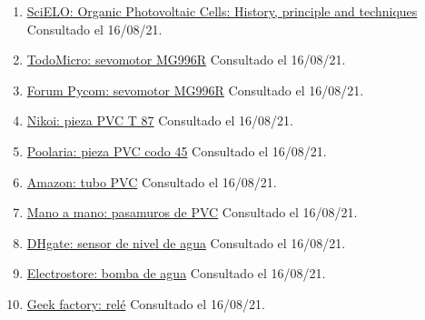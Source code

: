 \documentclass[12pt]{article}
\begin{document}
\begin{enumerate}
				\item 
				\label{bib: SciELO}
				\href{https://www.scielo.cl/scielo.php?script=sci_arttext\&pid=S0717-97072008000300001}{SciELO: Organic Photovoltaic Cells: History, principle and techniques} Consultado el 16/08/21.
				
				\item 
				\label{bib: todomicro}
				\href{https://www.todomicro.com.ar/motores-y-drivers-motores/234-servomotor-mg996r-digital-10kg-torque.html}{TodoMicro: sevomotor MG996R} Consultado el 16/08/21.
				
				\item 
				\label{bib: forum pycom}
				\href{https://forum.pycom.io/topic/982/mg996r-pwm-3v3-solved}{Forum Pycom: sevomotor MG996R} Consultado el 16/08/21.
				
				\item 
				\label{bib: Nikoi ferreteria}
				\href{https://www.nikoi.nl/es/pvc-t-stuk-87-125-mm-3-x-mof}{Nikoi: pieza PVC T 87\degree} Consultado el 16/08/21.
				
				\item 
				\label{bib: Poolaria}
				\href{https://www.poolaria.com/accesorios-de-pvc/317-codo-45-pvc-encolar.html}{Poolaria: pieza PVC codo 45\degree} Consultado el 16/08/21.
				
				\item 
				\label{bib: Amazon}
				\href{https://www.amazon.es/Di\%C3\%A1metro-\%C3\%A1ngulo-Rodillera-muffen-Fittings/dp/B017SXJFAM}{Amazon: tubo PVC} Consultado el 16/08/21.
				
				\item 
				\label{bib: mano a mano}
				\href{https://www.manomano.es/p/63-mm-21-2-pasamuros-de-pvc-para-tuberias-63-mm-27277644}{Mano a mano: pasamuros de PVC} Consultado el 16/08/21.
				
				\item 
				\label{bib: dhgate}
				\href{https://es.dhgate.com/product/longteng-dc-220v-liquid-water-level-sensor/441493541.html}{DHgate: sensor de nivel de agua} Consultado el 16/08/21.
				
				\item 
				\label{bib: electrostore}
				\href{https://grupoelectrostore.com/shop/motores/bombas-para-agua/mini-bomba-de-agua-sumergible-5v/}{Electrostore: bomba de agua} Consultado el 16/08/21.
				
				\item 
				\label{bib: geek factory}
				\href{https://www.geekfactory.mx/tienda/componentes-electronicos/relevadores/relevador-5-volts-srd-05vdc-sl-c/}{Geek factory: relé} Consultado el 16/08/21.
				

\end{enumerate}
\end{document}
